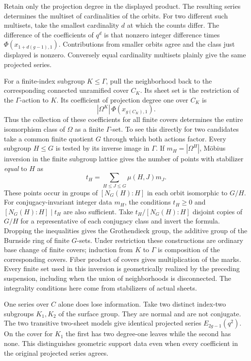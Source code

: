 Retain only the projection degree in the displayed product. The resulting series determines the multiset of cardinalities of the orbits. For two different such multisets, take the smallest cardinality \(d\) at which the counts differ. The difference of the coefficients of \(q^d\) is that nonzero integer difference times \(\Phi(x_{1+d(g-1),1})\). Contributions from smaller orbits agree and the class just displayed is nonzero. Conversely equal cardinality multisets plainly give the same projected series.

For a finite-index subgroup \(K\le\Gamma\), pull the neighborhood back to the corresponding connected unramified cover \(C_K\). Its sheet set is the restriction of the \(\Gamma\)-action to \(K\). Its coefficient of projection degree one over \(C_K\) is
\[|\Omega^K|\,\Phi(x_{g(C_K),1}).\]
Thus the collection of these coefficients for all finite covers determines the entire isomorphism class of \(\Omega\) as a finite \(\Gamma\)-set. To see this directly for two candidates take a common finite quotient \(G\) through which both actions factor. Every subgroup \(H\le G\) is tested by its inverse image in \(\Gamma\). If \(m_H=|\Omega^H|\), Möbius inversion in the finite subgroup lattice gives the number of points with stabilizer \emph{equal} to \(H\) as
\[t_H=\sum_{H\le J\le G}\mu(H,J)m_J .\]
These points occur in groups of \([N_G(H):H]\) in each orbit isomorphic to \(G/H\). For conjugacy-invariant integer data \(m_H\), the conditions \(t_H\ge0\) and \([N_G(H):H]\mid t_H\) are also sufficient. Take \(t_H/[N_G(H):H]\) disjoint copies of \(G/H\) for a representative of each conjugacy class and invert the formula. Dropping the inequalities gives the Grothendieck group, the additive group of the Burnside ring of finite \(G\)-sets. Under restriction these constructions are ordinary base change of finite covers; induction from \(K\) to \(\Gamma\) is composition of the corresponding covers. Fiber product of covers gives multiplication of the marks. Every finite set used in this inversion is geometrically realized by the preceding suspension, including when the union of neighborhoods is disconnected. The integrality conditions here come from stabilizers of actual sheets.

One series over \(C\) alone does lose information. Take two distinct index-two subgroups \(K_1,K_2\) of the surface group. They are normal and are not conjugate. The two transitive two-sheet models give identical projected series \(E_{2g-1}(q^2)\). On the cover for \(K_1\) the first has two degree-one leaves while the second has none. This distinguishes geometric support data even when every coefficient in the original projected series agrees.

